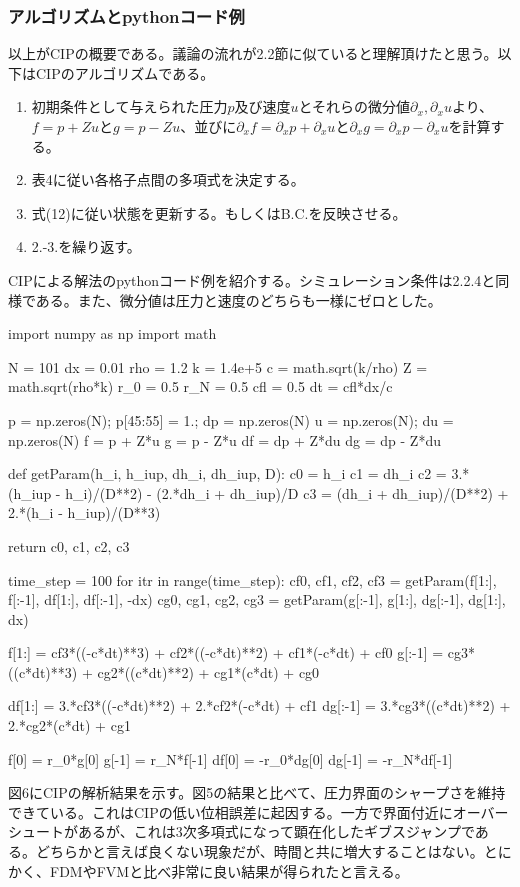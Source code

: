 \documentclass[dvipdfmx, 9pt, a4paper]{jsarticle}
\begin{document}
\subsubsection{アルゴリズムとpythonコード例}
以上がCIPの概要である。議論の流れが2.2節に似ていると理解頂けたと思う。以下はCIPのアルゴリズムである。
\begin{tcolorbox}[title=CIPによる移流方程式の求解]
\begin{enumerate}
\item 初期条件として与えられた圧力$p$及び速度$u$とそれらの微分値$\partial_x, \partial_xu$より、$f=p+Zu$と$g=p-Zu$、並びに$\partial_xf=\partial_xp+\partial_xu$と$\partial_xg=\partial_xp-\partial_xu$を計算する。
\item 表4に従い各格子点間の多項式を決定する。
\item 式(12)に従い状態を更新する。もしくはB.C.を反映させる。
\item 2.-3.を繰り返す。
\end{enumerate}
\end{tcolorbox}
CIPによる解法のpythonコード例を紹介する。シミュレーション条件は2.2.4と同様である。また、微分値は圧力と速度のどちらも一様にゼロとした。

\begin{python}
import numpy as np
import math

N = 101
dx = 0.01
rho = 1.2
k = 1.4e+5
c = math.sqrt(k/rho)
Z = math.sqrt(rho*k)
r_0 = 0.5
r_N = 0.5
cfl = 0.5
dt = cfl*dx/c

p = np.zeros(N); p[45:55] = 1.; dp = np.zeros(N)
u = np.zeros(N); du = np.zeros(N)
f = p + Z*u
g = p - Z*u
df = dp + Z*du
dg = dp - Z*du

def getParam(h_i, h_iup, dh_i, dh_iup, D):
	c0 = h_i
	c1 = dh_i
	c2 = 3.*(h_iup - h_i)/(D**2) - (2.*dh_i + dh_iup)/D
	c3 = (dh_i + dh_iup)/(D**2) + 2.*(h_i - h_iup)/(D**3)

	return c0, c1, c2, c3

time_step = 100
for itr in range(time_step):
	cf0, cf1, cf2, cf3 = getParam(f[1:], f[:-1], df[1:], df[:-1], -dx)
	cg0, cg1, cg2, cg3 = getParam(g[:-1], g[1:], dg[:-1], dg[1:], dx)

	f[1:] = cf3*((-c*dt)**3) + cf2*((-c*dt)**2) + cf1*(-c*dt) + cf0
	g[:-1] = cg3*((c*dt)**3) + cg2*((c*dt)**2) + cg1*(c*dt) + cg0

	df[1:] = 3.*cf3*((-c*dt)**2) + 2.*cf2*(-c*dt) + cf1
	dg[:-1] = 3.*cg3*((c*dt)**2) + 2.*cg2*(c*dt) + cg1

	f[0] = r_0*g[0]
	g[-1] = r_N*f[-1]
	df[0] = -r_0*dg[0]
	dg[-1] = -r_N*df[-1]
\end{python}\par
図6にCIPの解析結果を示す。図5の結果と比べて、圧力界面のシャープさを維持できている。これはCIPの低い位相誤差に起因する。一方で界面付近にオーバーシュートがあるが、これは3次多項式になって顕在化したギブスジャンプである。どちらかと言えば良くない現象だが、時間と共に増大することはない。とにかく、FDMやFVMと比べ非常に良い結果が得られたと言える。
\end{document}
